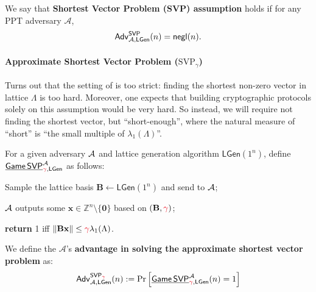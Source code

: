 \documentclass[../../book.tex]{subfiles}
\begin{document}
\begin{definition}
    We say that \textbf{Shortest Vector Problem (SVP) assumption} holds if for 
    any PPT adversary $\mathcal{A}$,
    \begin{equation*}
        \mathsf{Adv}^{\mathsf{SVP}}_{\mathcal{A},\mathsf{LGen}}(n) = \mathsf{negl}(n).
    \end{equation*}
\end{definition}

\paragraph{Approximate Shortest Vector Problem ($\text{SVP}_{\gamma}$)}

Turns out that the setting of  is too strict: finding the shortest non-zero vector in lattice $\Lambda$ is too hard.
Moreover, one expects that building cryptographic protocols solely on this assumption would be very hard.
So instead, we will require not finding the shortest vector, but ``short-enough'', where the natural measure of ``short'' is ``the small multiple of $\lambda_1(\Lambda)$''.

\begin{definition}\label{def:appr-svp}
    For a given adversary $\mathcal{A}$ and lattice generation algorithm $\mathsf{LGen}(1^{n})$, define $\underline{\GAME\,\mathsf{SVP}}^{\A}_{\textcolor{red!70!purple}{\gamma},\mathsf{LGen}}$ as follows:
    \begin{algoen}
        \item Sample the lattice basis $\mathbf{B} \gets \mathsf{LGen}(1^{n})$ and send to $\mathcal{A}$;
        \item $\mathcal{A}$ outputs some $\mathbf{x} \in \mathbb{Z}^{n} \setminus \{\mathbf{0}\}$ based on $(\mathbf{B},\textcolor{red!70!purple}{\gamma})$;
        \item \textbf{return} 1 iff $\|\mathbf{B}\mathbf{x}\| \leq \textcolor{red!70!purple}{\gamma}\lambda_1(\Lambda)$.
    \end{algoen}
    We define the $\mathcal{A}$'s \textbf{advantage in solving the approximate
    shortest vector problem} as:
    \begin{equation*}
        \Adv^{\mathsf{SVP}_{\textcolor{red!70!purple}{\gamma}}}_{\A,\mathsf{LGen}}(n) := \Pr\left[\underline{\GAME\,\mathsf{SVP}}^{\A}_{\textcolor{red!70!purple}{\gamma},\mathsf{LGen}}(n) = 1\right]
    \end{equation*} 
\end{definition}
\end{document}
